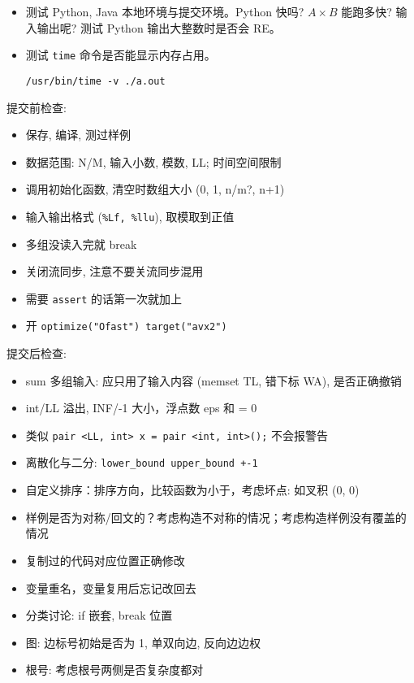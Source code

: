 \begin{small}
\begin{itemize}[leftmargin=1mm]
    \item 测试 Python, Java 本地环境与提交环境。Python 快吗? $A\times B$ 能跑多快? 输入输出呢? 测试 Python 输出大整数时是否会 RE。
    \item 测试 \texttt{time} 命令是否能显示内存占用。
\begin{verbatim}
/usr/bin/time -v ./a.out
\end{verbatim}
\end{itemize}
提交前检查: 
\begin{itemize}[leftmargin=1mm]
    \setlength{\itemsep}{0pt}
    \setlength{\parskip}{0.5pt}
\item 保存, 编译, 测过样例
\item 数据范围: N/M, 输入小数, 模数, LL; 时间空间限制
\item 调用初始化函数, 清空时数组大小 (0, 1, n/m?, n+1)
\item 输入输出格式 (\texttt{\%Lf, \%llu}), 取模取到正值
\item 多组没读入完就 break
\item 关闭流同步, 注意不要关流同步混用
\item 需要 \texttt{assert} 的话第一次就加上
\item 开 \texttt{optimize("Ofast") target("avx2")}
\end{itemize}
提交后检查:
\begin{itemize}[leftmargin=1mm]
\setlength{\itemsep}{0pt}
\setlength{\parskip}{0.5pt}
\item sum 多组输入: 应只用了输入内容 (memset TL, 错下标 WA), 是否正确撤销
\item int/LL 溢出, INF/-1 大小，浮点数 eps 和 = 0
\item 类似 \texttt{pair <LL, int> x = pair <int, int>();} 不会报警告 
\item 离散化与二分: \texttt{lower\_bound upper\_bound +-1}
\item 自定义排序：排序方向，比较函数为小于，考虑坏点: 如叉积 (0, 0)
\item 样例是否为对称/回文的？考虑构造不对称的情况；考虑构造样例没有覆盖的情况
\item 复制过的代码对应位置正确修改
\item 变量重名，变量复用后忘记改回去
\item 分类讨论: if 嵌套, break 位置
\item 图: 边标号初始是否为 1, 单双向边, 反向边边权
\item 根号: 考虑根号两侧是否复杂度都对
\end{itemize}
\end{small}